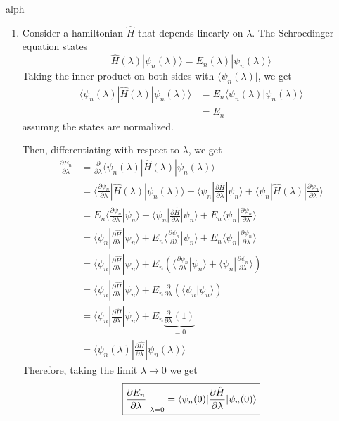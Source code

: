 \documentclass{article}
\newcommand{\ket}[1]{|#1 \rangle}
\newcommand{\bra}[1]{\langle #1|}
\newcommand{\inner}[2]{\langle #1 | #2 \rangle}
\newcommand{\restr}[2]{{%
  \left.\kern-\nulldelimiterspace %
  #1 %
  \vphantom{\big|} %
  \right|_{#2} %
  }}
\begin{document}
\vskip 0.5cm
alph\begin{enumerate}[label=(\alph*)]
  \item Consider a hamiltonian $\hat{H}$ that depends linearly on $\lambda$. The Schroedinger equation states 
  \[ \hat{H}(\lambda)  \ket{\psi_n(\lambda)} = E_n(\lambda) \ket{\psi_n(\lambda)} \]
  Taking the inner product on both sides with $\bra{\psi_n(\lambda)}$, we get 
  \begin{align*}
    \bra{\psi_n(\lambda)} \hat{H}(\lambda)  \ket{\psi_n(\lambda)} &= E_n \inner{\psi_n(\lambda)}{\psi_n(\lambda)} \\
    &= E_n
  \end{align*}
  assumng the states are normalized. 

  Then, differentiating with respect to $\lambda$, we get 
  \begin{align*}
    \frac{\partial E_n}{\partial \lambda} &= \frac{\partial }{\partial \lambda} \inner{\psi_n(\lambda)}{\hat{H}(\lambda)|\psi_n(\lambda)} \\ 
    &= \inner{\frac{\partial \psi_n}{\partial \lambda}}{\hat{H}(\lambda) | \psi_n(\lambda)} + \inner{\psi_n}{ \frac{\partial \hat{H}}{\partial \lambda} | \psi_n} + \inner{\psi_n}{\hat{H}(\lambda) | \frac{\partial \psi_n}{\partial \lambda}} \\
    &= E_n \inner{\frac{\partial \psi_n}{\partial \lambda}}{\psi_n} + \inner{\psi_n}{\frac{\partial \hat{H}}{\partial \lambda}|\psi_n} + E_n \inner{\psi_n}{\frac{\partial \psi_n}{\partial \lambda}} \\
    &= \inner{\psi_n}{\frac{\partial \hat{H}}{\partial \lambda}|\psi_n} + E_n \inner{\frac{\partial \psi_n}{\partial \lambda}}{\psi_n} + E_n \inner{\psi_n}{\frac{\partial \psi_n}{\partial \lambda}} \\
    &= \inner{\psi_n}{\frac{\partial \hat{H}}{\partial \lambda}|\psi_n} + E_n\left( \inner{\frac{\partial \psi_n}{\partial \lambda}}{\psi_n} + \inner{\psi_n}{\frac{\partial \psi_n}{\partial \lambda}}\right) \\
    &= \inner{\psi_n}{\frac{\partial \hat{H}}{\partial \lambda}|\psi_n} + E_n \frac{\partial}{\partial \lambda} \left( \inner{\psi_n}{\psi_n} \right) \\
    &= \inner{\psi_n}{\frac{\partial \hat{H}}{\partial \lambda}|\psi_n} + E_n \underbrace{\frac{\partial}{\partial \lambda} \left( 1 \right) }_{ = 0}\\
    &= \inner{\psi_n(\lambda)}{\frac{\partial \hat{H}}{\partial \lambda}|\psi_n(\lambda)}
  \end{align*}
  Therefore, taking the limit $\lambda \rightarrow 0$ we get 
  \[ \boxed{ \restr{\frac{\partial E_n}{\partial \lambda}}{\lambda = 0} = \inner{\psi_n(0)}{\frac{\partial \hat{H}}{\partial \lambda}|\psi_n(0)}} \]


\end{enumerate}
\end{document}
